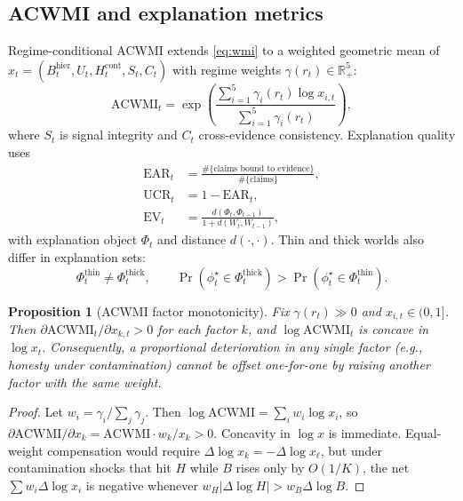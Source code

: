 \documentclass[12pt]{article}
\newtheorem{proposition}{Proposition}
\begin{document}
\subsection{ACWMI and explanation metrics}
Regime-conditional ACWMI extends \eqref{eq:wmi} to a weighted geometric mean of
$x_t=(B^{\mathrm{hier}}_t,U_t,H^{\mathrm{cont}}_t,S_t,C_t)$ with regime weights $\gamma(r_t)\in\mathbb{R}^5_{+}$:
\begin{equation}
\mathrm{ACWMI}_t
=\exp\!\left(
\frac{\sum_{i=1}^{5}\gamma_i(r_t)\log x_{i,t}}{\sum_{i=1}^{5}\gamma_i(r_t)}
\right),
\label{eq:acwmi}
\end{equation}
where $S_t$ is signal integrity and $C_t$ cross-evidence consistency. Explanation quality uses
\begin{align}
\mathrm{EAR}_t&=\frac{\#\{\text{claims bound to evidence}\}}{\#\{\text{claims}\}},
\label{eq:ear}\\
\mathrm{UCR}_t&=1-\mathrm{EAR}_t,
\label{eq:ucr}\\
\mathrm{EV}_t&=\frac{d(\Phi_t,\Phi_{t-1})}{1+d(W_t,W_{t-1})},
\label{eq:ev}
\end{align}
with explanation object $\Phi_t$ and distance $d(\cdot,\cdot)$. Thin and thick worlds also differ in explanation sets:
\begin{equation}
\Phi^{\mathrm{thin}}_t\neq\Phi^{\mathrm{thick}}_t,\qquad
\Pr(\phi^\star_t\in\Phi^{\mathrm{thick}}_t)>\Pr(\phi^\star_t\in\Phi^{\mathrm{thin}}_t).
\label{eq:phi}
\end{equation}

\begin{proposition}[ACWMI factor monotonicity]
\label{prop:acwmi}
Fix $\gamma(r_t)\gg 0$ and $x_{i,t}\in(0,1]$. Then $\partial\mathrm{ACWMI}_t/\partial x_{k,t}>0$ for each factor $k$, and $\log\mathrm{ACWMI}_t$ is concave in $\log x_t$. Consequently, a proportional deterioration in any single factor (e.g., honesty under contamination) cannot be offset one-for-one by raising another factor with the same weight.
\end{proposition}
\begin{proof}
Let $w_i=\gamma_i/\sum_j\gamma_j$. Then $\log\mathrm{ACWMI}=\sum_i w_i\log x_i$, so $\partial\mathrm{ACWMI}/\partial x_k=\mathrm{ACWMI}\cdot w_k/x_k>0$. Concavity in $\log x$ is immediate. Equal-weight compensation would require $\Delta\log x_k=-\Delta\log x_\ell$, but under contamination shocks that hit $H$ while $B$ rises only by $O(1/K)$, the net $\sum w_i\Delta\log x_i$ is negative whenever $w_H|\Delta\log H|>w_B\Delta\log B$.
\end{proof}
\end{document}
